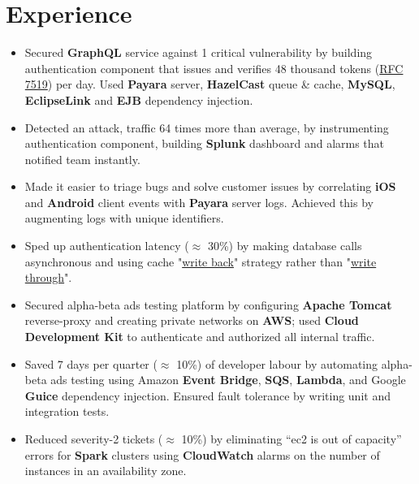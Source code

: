 \section{Experience}
\begin{itemize}[leftmargin=*]
    \item {
        Secured \textbf{GraphQL} service against 1 critical vulnerability by building authentication component that issues and verifies 48 thousand tokens (\href{https://datatracker.ietf.org/doc/html/rfc7519}{RFC 7519}) per day. Used \textbf{Payara} server, \textbf{HazelCast} queue \& cache, \textbf{MySQL}, \textbf{EclipseLink} and \textbf{EJB} dependency injection.
    }
    \item {
        Detected an attack, traffic 64 times more than average, by instrumenting authentication component, building \textbf{Splunk} dashboard and alarms that notified team instantly.
    }
    \item {
        Made it easier to triage bugs and solve customer issues by correlating \textbf{iOS} and \textbf{Android} client events with \textbf{Payara} server logs. Achieved this by augmenting logs with unique identifiers.
    }
    \item {
        Sped up authentication latency ($\approx$ 30\%) by making database calls asynchronous and using cache "\href{https://en.wikipedia.org/wiki/Cache_(computing)#Writing_policies}{write back}" strategy rather than "\href{https://en.wikipedia.org/wiki/Cache_(computing)#Writing_policies}{write through}".
    }
\end{itemize}

\begin{itemize}[leftmargin=*]
    \item {
        Secured alpha-beta ads testing platform by configuring \textbf{Apache Tomcat} reverse-proxy and creating private networks on \textbf{AWS}; used \textbf{Cloud Development Kit} to authenticate and authorized all internal traffic.
    }
    \item {
        Saved 7 days per quarter ($\approx$ 10\%) of developer labour by automating alpha-beta ads testing using Amazon \textbf{Event Bridge}, \textbf{SQS}, \textbf{Lambda}, and Google \textbf{Guice} dependency injection. Ensured fault tolerance by writing unit and integration tests.
    }
    \item {
        Reduced severity-2 tickets ($\approx$ 10\%) by eliminating “ec2 is out of capacity” errors for \textbf{Spark} clusters using \textbf{CloudWatch} alarms on the number of instances in an availability zone.
    }
\end{itemize}

